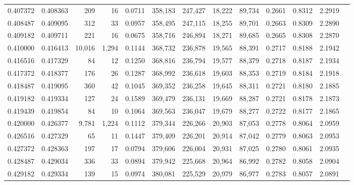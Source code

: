 \begin{tabular}{rrrrrrrrrrrrr}
0.407372 & 0.408363 &    209 &    16 &                                     0.0711 & 358,183 & 247,427 &  18,222 &  89,734 & 0.2661 & 0.8312 & 2.2919 \\
0.408487 & 0.409095 &    312 &    33 &                                     0.0957 & 358,495 & 247,115 &  18,255 &  89,701 & 0.2663 & 0.8309 & 2.2890 \\
0.409182 & 0.409711 &    221 &    16 &                                     0.0675 & 358,716 & 246,894 &  18,271 &  89,685 & 0.2665 & 0.8308 & 2.2870 \\
0.410000 & 0.416413 & 10,016 & 1,294 &                                     0.1144 & 368,732 & 236,878 &  19,565 &  88,391 & 0.2717 & 0.8188 & 2.1942 \\
0.416516 & 0.417329 &     84 &    12 &                                     0.1250 & 368,816 & 236,794 &  19,577 &  88,379 & 0.2718 & 0.8187 & 2.1934 \\
0.417372 & 0.418377 &    176 &    26 &                                     0.1287 & 368,992 & 236,618 &  19,603 &  88,353 & 0.2719 & 0.8184 & 2.1918 \\
0.418487 & 0.419095 &    360 &    42 &                                     0.1045 & 369,352 & 236,258 &  19,645 &  88,311 & 0.2721 & 0.8180 & 2.1885 \\
0.419182 & 0.419334 &    127 &    24 &                                     0.1589 & 369,479 & 236,131 &  19,669 &  88,287 & 0.2721 & 0.8178 & 2.1873 \\
0.419439 & 0.419854 &     84 &    10 &                                     0.1064 & 369,563 & 236,047 &  19,679 &  88,277 & 0.2722 & 0.8177 & 2.1865 \\
0.420000 & 0.426377 &  9,781 & 1,224 &                                     0.1112 & 379,344 & 226,266 &  20,903 &  87,053 & 0.2778 & 0.8064 & 2.0959 \\
0.426516 & 0.427329 &     65 &    11 &                                     0.1447 & 379,409 & 226,201 &  20,914 &  87,042 & 0.2779 & 0.8063 & 2.0953 \\
0.427372 & 0.428363 &    197 &    17 &                                     0.0794 & 379,606 & 226,004 &  20,931 &  87,025 & 0.2780 & 0.8061 & 2.0935 \\
0.428487 & 0.429034 &    336 &    33 &                                     0.0894 & 379,942 & 225,668 &  20,964 &  86,992 & 0.2782 & 0.8058 & 2.0904 \\
0.429182 & 0.429334 &    139 &    15 &                                     0.0974 & 380,081 & 225,529 &  20,979 &  86,977 & 0.2783 & 0.8057 & 2.0891 \\

\end{tabular}
